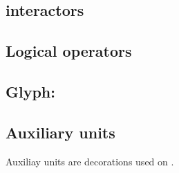 \subsection{interactors}\label{sec:interactors}





\subsection{Logical operators}\label{sec:logic}
 






\subsection{Glyph: }\label{sec:perturbation}



\subsection{Auxiliary units}\label{sec:aux}

Auxiliay units are decorations used on .






